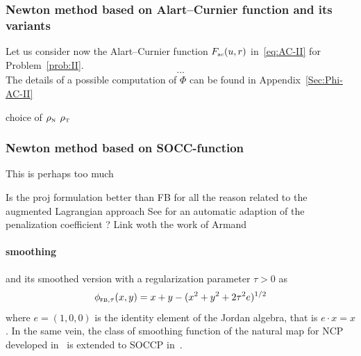 \subsubsection{Newton method based on Alart--Curnier function and its variants}
\label{Sec:NSN-AC}
Let us consider now the Alart--Curnier function $F_{{\hbox{\tiny{ac}}}}(u,r)$ in~\eqref{eq:AC-II} for Problem~\ref{prob:II}.
\begin{equation}
  \label{eq:phiphi-AC}
   \ldots
\end{equation}
The details of a possible computation of $\Phi$ can be found in Appendix~\ref{Sec:Phi-AC-II}

\begin{ndrva}
  choice of $\rho_{\hbox{\tiny{N}}}$ $\rho_{\hbox{\tiny{T}}}$
\end{ndrva}



\subsubsection{Newton method based on  SOCC-function}
\label{Sec:Num-SOCCP}


\begin{ndrva}
  This is perhaps  too much
\end{ndrva}


\begin{ndrva}
  Is the proj formulation better than FB for all the reason related to the augmented Lagrangian approach
  See \cite{Mirar.Arora_SMO2004-I} for an automatic adaption of the penalization coefficient ? Link woth the work of Armand
\end{ndrva}



\paragraph{smoothing}
and its smoothed version with a regularization parameter $\tau>0$ as
\begin{equation}
  \label{eq:Jordan-FB-smoothed}
  \phi_{\fb, \tau}(x,y) = x+y - (x^2 + y^2 + 2 \tau^2 e)^{1/2}
\end{equation}
where $e = (1,0,0)$ is the identity element of the Jordan algebra, that is $e \cdot x =x$. In the same vein, the class of smoothing function of the natural map for NCP developed in~\cite{Chen.Mangasarian1996} is extended to SOCCP in~\cite{Fukushima.ea2001}.



